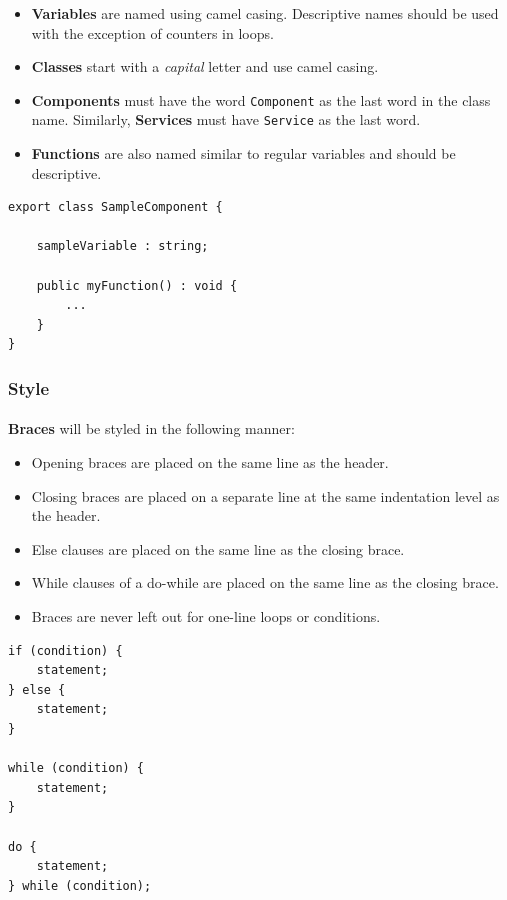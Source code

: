 \documentclass{article}
\begin{document}
    \begin{itemize}
        \item \textbf{Variables} are named using camel casing. Descriptive names
                should be used with the exception of counters in loops.
        \item \textbf{Classes} start with a \textit{capital} letter and use
                camel casing.
        \item \textbf{Components} must have the word \texttt{Component} as the
                last word in the class name. Similarly, \textbf{Services} must
                have \texttt{Service} as the last word.
        \item \textbf{Functions} are also named similar to regular variables and
                should be descriptive.
    \end{itemize}

    \begin{lstlisting}
export class SampleComponent {

    sampleVariable : string;

    public myFunction() : void {
        ...
    }
}
    \end{lstlisting}

    \subsubsection{Style}
    \label{sec:typescript-st}

    \paragraph{}
    \textbf{Braces} will be styled in the following manner:
    \begin{itemize}
        \item Opening braces are placed on the same line as the header.
        \item Closing braces are placed on a separate line at the same
                indentation level as the header.
        \item Else clauses are placed on the same line as the closing brace.
        \item While clauses of a do-while are placed on the same line as the
                closing brace.
        \item Braces are never left out for one-line loops or conditions.
    \end{itemize}

    \begin{lstlisting}
if (condition) {
    statement;
} else {
    statement;
}

while (condition) {
    statement;
}

do {
    statement;
} while (condition);
    \end{lstlisting}
\end{document}
